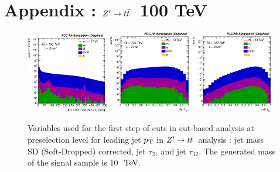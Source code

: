 \documentclass{cernrep}
\newcommand*{\zptt}{\ensuremath{Z^{\prime} \rightarrow \ttbar}}
\begin{document}
\clearpage
\newpage

\section{Appendix : \zptt\ 100 TeV}
\label{appendix:zptt100}


\begin{figure}[!htb]\centering
\includegraphics[width=0.32\textwidth]{Fig/Zptt/Jet1_trk02_SD_Cor_m_sel0_nostack_log.eps}
\includegraphics[width=0.32\textwidth]{Fig/Zptt/Jet1_tau21_sel0_nostack_log.eps}
\includegraphics[width=0.32\textwidth]{Fig/Zptt/Jet1_tau32_sel0_nostack_log.eps}
\caption{Variables used for the first step of cuts in cut-based analysis at preselection level for leading jet $p\sb{\scriptstyle\mathrm{T}}$ in \zptt\ analysis : jet mass SD (Soft-Dropped) corrected, jet $\tau_{21}$ and jet $\tau_{32}$. The generated mass of the signal sample is 10 $\TeV$.}
\label{fig:Zptt_sel0_cut}
\end{figure}
\end{document}
